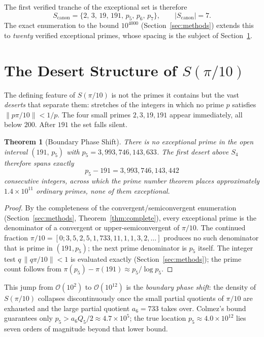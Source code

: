 \documentclass[11pt,letterpaper]{article}
\newtheorem{theorem}{Theorem}[section]
\theoremstyle{definition}
\begin{document}
The first verified tranche of the exceptional set is therefore
\[
  S_\mathrm{canon} = \{2,\,3,\,19,\,191,\,p_5,\,p_6,\,p_7\},
  \qquad |S_\mathrm{canon}| = 7.
\]
The exact enumeration to the bound $10^{4000}$ (Section~\ref{sec:methods})
extends this to \emph{twenty} verified exceptional primes, whose spacing is the
subject of Section~\ref{sec:desert}.

\section{The Desert Structure of $S(\pi/10)$}\label{sec:desert}

The defining feature of $S(\pi/10)$ is not the primes it contains but the vast
\emph{deserts} that separate them: stretches of the integers in which no prime
$p$ satisfies $\|p\pi/10\| < 1/p$.  The four small primes $2,3,19,191$ appear
immediately, all below $200$.  After $191$ the set falls silent.

\begin{theorem}[Boundary Phase Shift]\label{thm:phaseshift}
There is no exceptional prime in the open interval $(191,\,p_5)$ with
$p_5 = 3{,}993{,}746{,}143{,}633$.  The first desert above $S_4$ therefore spans
exactly
\[
  p_5 - 191 = 3{,}993{,}746{,}143{,}442
\]
consecutive integers, across which the prime number theorem places approximately
$1.4\times 10^{11}$ ordinary primes, none of them exceptional.
\end{theorem}
\begin{proof}
By the completeness of the convergent/semiconvergent enumeration
(Section~\ref{sec:methods}, Theorem~\ref{thm:complete}), every exceptional prime
is the denominator of a convergent or upper-semiconvergent of $\pi/10$.  The
continued fraction $\pi/10 = [0;3,5,2,5,1,733,11,1,1,3,2,\ldots]$ produces no
such denominator that is prime in $(191,p_5)$; the next prime denominator is
$p_5$ itself.  The integer test $q\,\|q\pi/10\| < 1$ is evaluated exactly
(Section~\ref{sec:methods}); the prime count follows from
$\pi(p_5)-\pi(191)\approx p_5/\log p_5$.
\end{proof}

This jump from $\mathcal{O}(10^2)$ to $\mathcal{O}(10^{12})$ is the
\emph{boundary phase shift}: the density of $S(\pi/10)$ collapses
discontinuously once the small partial quotients of $\pi/10$ are exhausted and
the large partial quotient $a_6 = 733$ takes over.  Colmez's
bound~\cite{Colmez93} guarantees only $p_5 > a_6 Q_5/2 \approx 4.7\times10^5$;
the true location $p_5\approx 4.0\times10^{12}$ lies seven orders of magnitude
beyond that lower bound.
\end{document}
